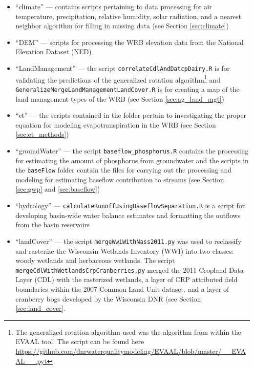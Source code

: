 \begin{itemize}
\item ``climate'' --- contains scripts pertaining to data processing for air temperature, precipitation, relative humidity, solar radiation, and a nearest neighbor algorithm for filling in missing data (see Section \ref{sec:climate})

\item ``DEM'' --- scripts for processing the WRB elevation data from the National Elevation Dataset (NED)

\item ``LandManagement'' --- the script \texttt{correlateCdlAndDatcpDairy.R} is for validating the predictions of the generalized rotation algorithm\footnote{The generalized rotation algorithm used was the algorithm from within the EVAAL tool. The script can be found here \url{https://github.com/dnrwaterqualitymodeling/EVAAL/blob/master/__EVAAL__.pyt}} and \texttt{GeneralizeMergeLandManagementLandCover.R} is for creating a map of the land management types of the WRB (see Section \ref{sec:ag_land_mgt})

\item ``et'' --- the scripts contained in the folder pertain to investigating the proper equation for modeling evapotranspiration in the WRB (see Section \ref{sec:et_methods})

\item ``groundWater'' --- the script \texttt{baseflow\_phosphorus.R} contains the processing for estimating the amount of phosphorus from groundwater and the scripts in the \texttt{baseFlow} folder contain the files for carrying out the processing and modeling for estimating baseflow contribution to streams (see Section \ref{sec:gwp} and \ref{sec:baseflow})

\item ``hydrology'' --- \texttt{calculateRunoffUsingBaseflowSeparation.R} is a script for developing  basin-wide water balance estimates and formatting the outflows from the basin reservoirs

\item ``landCover'' --- the script \texttt{mergeWwiWithNass2011.py} was used to reclassify and rasterize the Wisconsin Wetlands Inventory (WWI) into two classes: woody wetlands and herbaceous wetlands. The script \texttt{mergeCdlWithWetlandsCrpCranberries.py} merged the 2011 Cropland Data Layer (CDL) with the rasterized wetlands, a layer of CRP attributed field boundaries within the 2007 Common Land Unit dataset, and a layer of cranberry bogs developed by the Wisconsin DNR (see Section \ref{sec:land_cover}.


\end{itemize}
